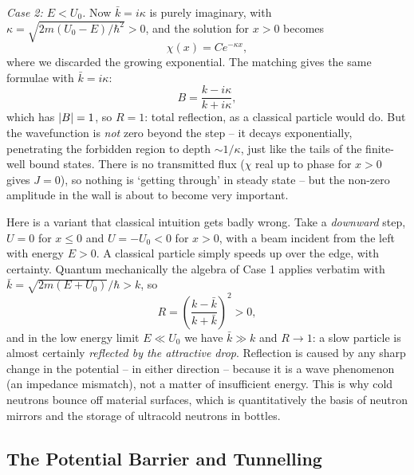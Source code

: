 \documentclass[a4paper]{scrartcl}
\begin{document}
\emph{Case 2: $E < U_0$.} Now $\bar{k} = i \kappa$ is purely imaginary, with $\kappa = \sqrt{2m(U_0 - E)/\hbar^2} > 0$, and the solution for $x > 0$ becomes
$$
\chi(x) = C e^{-\kappa x},
$$
where we discarded the growing exponential. The matching gives the same formulae with $\bar k = i\kappa$:
$$
B = \frac{k - i \kappa}{k + i \kappa},
$$
which has $\lvert B\rvert = 1$, so $R = 1$: total reflection, as a classical particle would do. But the wavefunction is \emph{not} zero beyond the step -- it decays exponentially, penetrating the forbidden region to depth $\sim 1/\kappa$, just like the tails of the finite-well bound states. There is no transmitted flux ($\chi$ real up to phase for $x>0$ gives $J = 0$), so nothing is `getting through' in steady state -- but the non-zero amplitude in the wall is about to become very important.

\begin{example}
    Here is a variant that classical intuition gets badly wrong. Take a \emph{downward} step, $U = 0$ for $x \leq 0$ and $U = -U_0 < 0$ for $x > 0$, with a beam incident from the left with energy $E > 0$. A classical particle simply speeds up over the edge, with certainty. Quantum mechanically the algebra of Case 1 applies verbatim with $\bar{k} = \sqrt{2m(E + U_0)}/\hbar > k$, so
    $$
    R = \left( \frac{k - \bar{k}}{k + \bar{k}} \right)^2 > 0,
    $$
    and in the low energy limit $E \ll U_0$ we have $\bar{k} \gg k$ and $R \rightarrow 1$: a slow particle is almost certainly \emph{reflected by the attractive drop}. Reflection is caused by any sharp change in the potential -- in either direction -- because it is a wave phenomenon (an impedance mismatch), not a matter of insufficient energy. This is why cold neutrons bounce off material surfaces, which is quantitatively the basis of neutron mirrors and the storage of ultracold neutrons in bottles.
\end{example}

\subsection{The Potential Barrier and Tunnelling}
\end{document}
